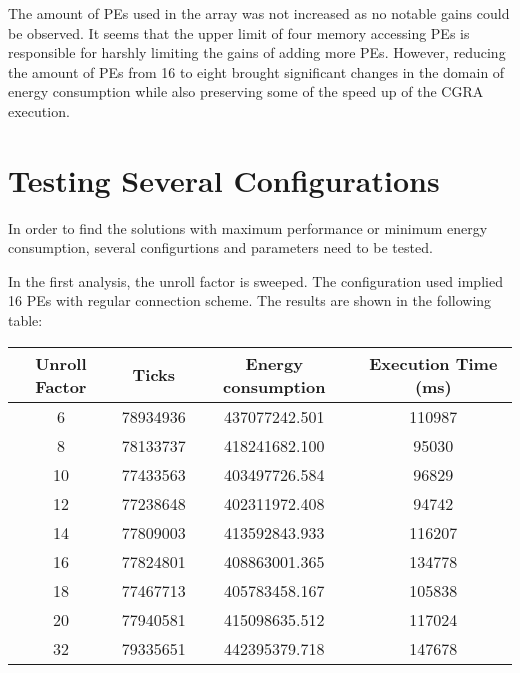		The amount of PEs used in the array was not increased as no notable gains could be observed. It seems that the upper limit of four memory accessing PEs is responsible for harshly limiting the gains of adding more PEs. 
		However, reducing the amount of PEs from \num{16} to eight brought significant changes in the domain of energy consumption while also preserving some of the speed up of the CGRA execution.


  \section{Testing Several Configurations} %
	\label{sec:impl_max_perf}\newline
	
	In order to find the solutions with maximum performance or minimum energy consumption, several configurtions and parameters need to be tested. 
	
	In the first analysis, the unroll factor is sweeped. The configuration used implied 16 PEs with regular connection scheme. The results are shown in the following table:
	
	\begin{center}
    \begin{tabular}{||c | c c c ||} 
      \hline
      Unroll Factor & Ticks & Energy consumption & Execution Time (ms)\\ [0.5ex] 
      \hline\hline
      6 & 78934936 & 437077242.501 & 110987 \\
      \hline
      8 & 78133737 & 418241682.100 & 95030 \\
      \hline
      10 & 77433563 & 403497726.584 & 96829 \\
      \hline
      12 & 77238648 & 402311972.408 & 94742 \\
      \hline
      14 & 77809003 & 413592843.933 & 116207 \\  
      \hline
      16 & 77824801 & 408863001.365 & 134778 \\  
      \hline
      18 & 77467713 & 405783458.167 & 105838 \\ 
      \hline
      20 & 77940581 & 415098635.512 & 117024 \\  
      \hline
      32 & 79335651 & 442395379.718 & 147678 \\ [1ex] 
      \hline
    \end{tabular}
  \end{center}\newline
  
